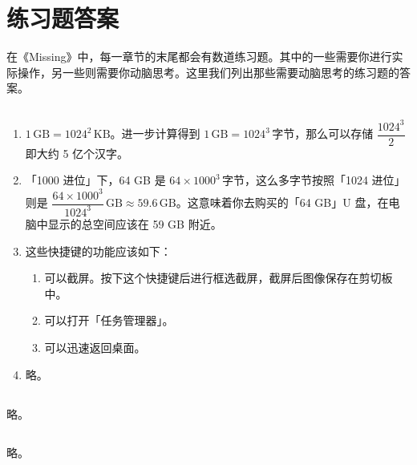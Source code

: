 \chapter{练习题答案}
\label{answers}
\fancyhead[OL]{\bfseries\nouppercase\rightmark}
\setcounter{section}{-1}

在《Missing》中，每一章节的末尾都会有数道练习题。其中的一些需要你进行实际操作，另一些则需要你动脑思考。这里我们列出那些需要动脑思考的练习题的答案。

\section{}

\begin{enumerate}
  \item $1\,\mathrm{GB}=1024^2\,\mathrm{KB}$。进一步计算得到 $1\,\mathrm{GB}=1024^3\,\text{字节}$，那么可以存储 $\dfrac{1024^3}{2}$ 即大约 5 亿个汉字。
  \item 「1000 进位」下，64 GB 是 $64\times1000^3\,\text{字节}$，这么多字节按照「1024 进位」则是 $\dfrac{64\times1000^3}{1024^3}\,\mathrm{GB}\approx59.6\,\mathrm{GB}$。这意味着你去购买的「64 GB」U 盘，在电脑中显示的总空间应该在 59 GB 附近。
  \item 这些快捷键的功能应该如下：
  \begin{enumerate}
    \item 可以截屏。按下这个快捷键后进行框选截屏，截屏后图像保存在剪切板中。
    \item 可以打开「任务管理器」。
    \item 可以迅速返回桌面。
  \end{enumerate}
  \item 略。
\end{enumerate}

\section{}

略。

\section{}

略。

\section{}


